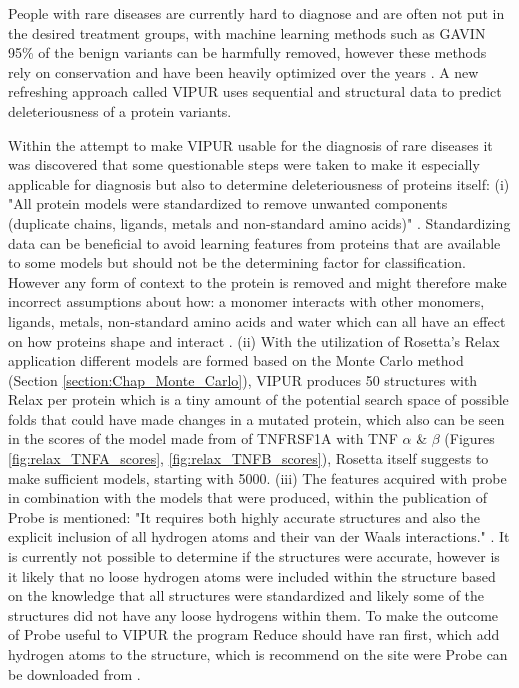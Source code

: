 People with rare diseases are currently hard to diagnose and are often not put in the desired treatment groups, with machine learning methods such as GAVIN 95\% of the benign variants can be harmfully removed, however these methods rely on conservation and have been heavily optimized over the years \cite{}.
A new refreshing approach called VIPUR uses sequential and structural data to predict deleteriousness of a protein variants.

Within the attempt to make VIPUR usable for the diagnosis of rare diseases it was discovered that some questionable steps were taken to make it especially applicable for diagnosis but also to determine deleteriousness of proteins itself: (i) "All protein models were standardized to remove unwanted components (duplicate chains, ligands, metals and non-standard amino acids)" \cite{}.
Standardizing data can be beneficial to avoid learning features from proteins that are available to some models but should not be the determining factor for classification. However any form of context to the protein is removed and might therefore make incorrect assumptions about how: a monomer interacts with other monomers, ligands, metals, non-standard amino acids and water which can all have an effect on how proteins shape and interact \cite{}.
(ii) With the utilization of Rosetta's Relax application different models are formed based on the Monte Carlo method (Section \ref{section:Chap_Monte_Carlo}), VIPUR produces 50 structures with Relax per protein which is a tiny amount of the potential search space of possible folds that could have made changes in a mutated protein, which also can be seen in the scores of the model made from of TNFRSF1A with TNF $\alpha$ \& $\beta$ (Figures \ref{fig:relax_TNFA_scores}, \ref{fig:relax_TNFB_scores}), Rosetta itself suggests to make sufficient models, starting with 5000\cite{}.
(iii) The features acquired with probe in combination with the models that were produced, within the publication of Probe is mentioned: "It requires both highly accurate structures and also the explicit inclusion of all hydrogen atoms and their van der Waals interactions." \cite{}.
It is currently not possible to determine if the structures were accurate, however is it likely that no loose hydrogen atoms were included within the structure based on the knowledge that all structures were standardized and likely some of the structures did not have any loose hydrogens within them. To make the outcome of Probe useful to VIPUR the program Reduce should have ran first, which add hydrogen atoms to the structure, which is recommend on the site were Probe can be downloaded from \cite{}.


